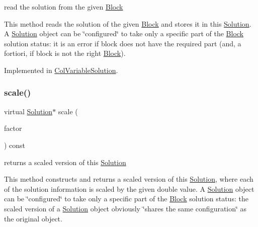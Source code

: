 read the solution from the given \mbox{\hyperlink{class_s_m_spp__di__unipi__it_1_1_block}{Block}} 

This method reads the solution of the given \mbox{\hyperlink{class_s_m_spp__di__unipi__it_1_1_block}{Block}} and stores it in this \mbox{\hyperlink{class_s_m_spp__di__unipi__it_1_1_solution}{Solution}}. A \mbox{\hyperlink{class_s_m_spp__di__unipi__it_1_1_solution}{Solution}} object can be \char`\"{}configured\char`\"{} to take only a specific part of the \mbox{\hyperlink{class_s_m_spp__di__unipi__it_1_1_block}{Block}} solution status\+: it is an error if block does not have the required part (and, a fortiori, if block is not the right \mbox{\hyperlink{class_s_m_spp__di__unipi__it_1_1_block}{Block}}). 

Implemented in \mbox{\hyperlink{class_s_m_spp__di__unipi__it_1_1_col_variable_solution_a13487898d41f593b3cc0ae6a69feb3ff}{Col\+Variable\+Solution}}.

\mbox{\label{class_s_m_spp__di__unipi__it_1_1_solution_abf1a2d1763f128a72b2677d4b9ff4d3b}} 
\subsubsection{\texorpdfstring{scale()}{scale()}}
{\footnotesize\ttfamily virtual \mbox{\hyperlink{class_s_m_spp__di__unipi__it_1_1_solution}{Solution}}$\ast$ scale (\begin{DoxyParamCaption}\item[{double}]{factor }\end{DoxyParamCaption}) const\hspace{0.3cm}{\ttfamily [pure virtual]}}



returns a scaled version of this \mbox{\hyperlink{class_s_m_spp__di__unipi__it_1_1_solution}{Solution}} 

This method constructs and returns a scaled version of this \mbox{\hyperlink{class_s_m_spp__di__unipi__it_1_1_solution}{Solution}}, where each of the solution information is scaled by the given double value. A \mbox{\hyperlink{class_s_m_spp__di__unipi__it_1_1_solution}{Solution}} object can be \char`\"{}configured\char`\"{} to take only a specific part of the \mbox{\hyperlink{class_s_m_spp__di__unipi__it_1_1_block}{Block}} solution status\+: the scaled version of a \mbox{\hyperlink{class_s_m_spp__di__unipi__it_1_1_solution}{Solution}} object obviously \char`\"{}shares the same configuration\char`\"{} as the original object.

